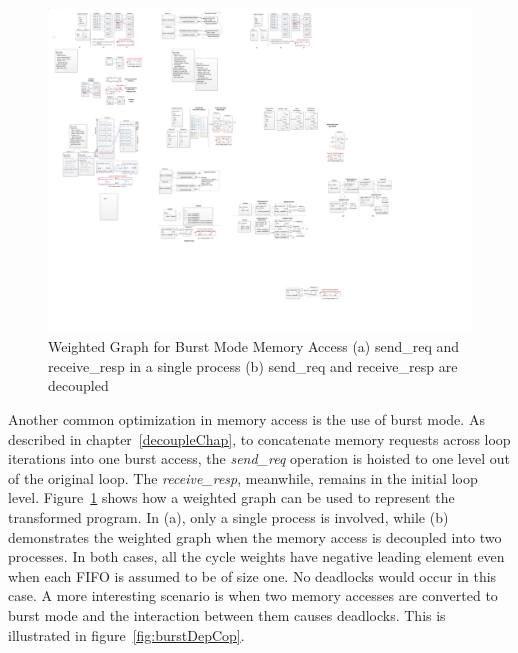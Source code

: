 \begin{figure}[htp]
\begin{center}
\includegraphics[width=0.95\linewidth]{chap4fig/burstDependence.pdf}
\caption{Weighted Graph for Burst Mode Memory Access (a) send\_req and receive\_resp in a single process (b) send\_req and receive\_resp are decoupled
\label{fig:burstDep}}
\end{center}
\end{figure}

Another common optimization in memory access is the use of burst mode.
As described in chapter~\ref{decoupleChap}, to concatenate
memory requests across loop iterations into one burst access, the \textit{send\_req} operation is hoisted to one level out of the original loop. 
The \textit{receive\_resp}, meanwhile, remains in the initial loop level. Figure~\ref{fig:burstDep} shows how a weighted graph can be used to represent the transformed program. In (a), only a single process is involved, while (b) demonstrates
the weighted graph when the memory access is decoupled into two processes. In both cases, all the cycle weights have negative leading element even when each FIFO is assumed to be of size one. No deadlocks would occur in this case. A more interesting
scenario is when two memory accesses are converted to burst mode and the interaction
between them causes deadlocks. This is illustrated in figure~\ref{fig:burstDepCop}.


